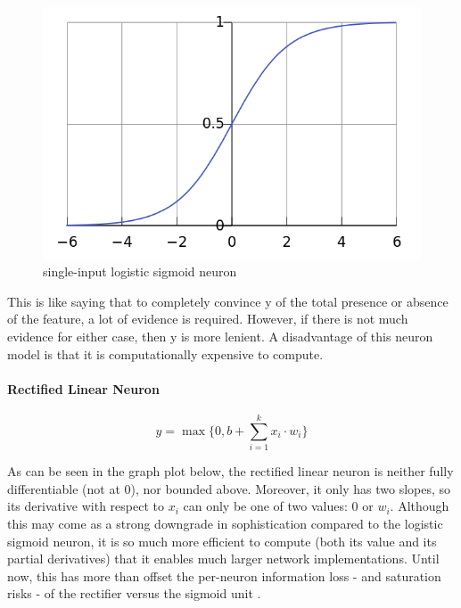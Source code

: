 \documentclass[a4paper,11pt]{article}
\begin{document}
\begin{figure}[h!]
	\centering
	\includegraphics[scale=0.3]{images/sigmoid.png}
	\caption{single-input logistic sigmoid neuron}
\end{figure}

This is like saying that to completely convince y of the total presence or absence of the feature, a lot of evidence is required. However, if there is not much evidence for either case, then y is more lenient. 
A disadvantage of this neuron model is that it is computationally expensive to compute.
                
\paragraph{Rectified Linear Neuron}
\begin{equation}
\label{relu}
y = \max\{0, b + \sum\limits_{i=1}^k x_{i}\cdot w_{i}\}
\end{equation}

As can be seen in the graph plot below, the rectified linear neuron is neither fully differentiable (not at $0$), nor bounded above. Moreover, it only has two slopes, so its derivative with respect to $x_{i}$ can only be one of two values: $0$ or $w_{i}$. Although this may come as a strong downgrade in sophistication compared to the logistic sigmoid neuron, it is so much more efficient to compute (both its value and its partial derivatives) that it enables much larger network implementations\cite{krizhevsky}. Until now, this has more than offset the per-neuron information loss - and saturation risks - of the rectifier versus the sigmoid unit \cite{rectifier}. \\
\end{document}
